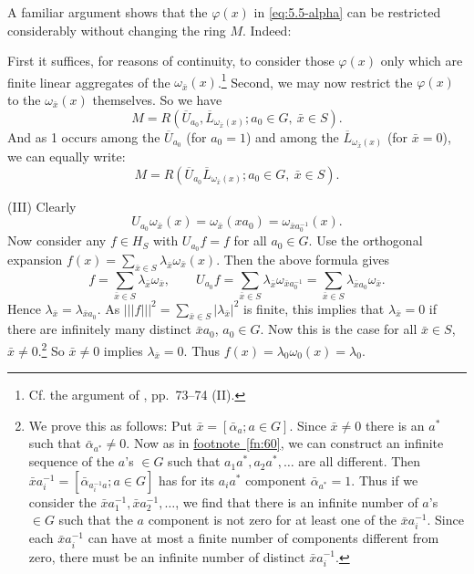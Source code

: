 \documentclass[b5paper,twoside]{article}
\theoremstyle{mvnplain}
\newcommand{\M}{\mathbf M}
\newcommand{\R}{\mathbf R}
\newcommand{\Hilbert}{\mathfrak H}
\newcommand{\OpNorm}[1]{\left\lvert\left\lvert\left\lvert#1\right\rvert\right\rvert\right\rvert}
\def\M{M}%
\def\R{R}%
\def\Hilbert{H}%
\def\mathfrak#1{#1}%
\begin{document}
A familiar argument shows that the \(\varphi(x)\) in \eqref{eq:5.5-alpha}
can be restricted considerably without changing the ring \(\M\). Indeed:

First it suffices, for reasons of continuity, to consider those \(\varphi(x)\)
only which are finite linear aggregates of the
\(\omega_{\bar x}(x)\).\footnote{Cf. the argument of
\cite{ref7}, pp.~73--74 (II).} Second, we may now restrict the
\(\varphi(x)\) to the \(\omega_{\bar x}(x)\) themselves. So we have
\begin{equation}\tag{5.5.\(\beta\)}\label{eq:5.5-beta}
 \M=\R(\overline U_{a_0},\overline L_{\omega_{\bar x}(x)};
 a_0\in\mathfrak G,\ \bar x\in\mathfrak S).
\end{equation}
And as 1 occurs among the \(\overline U_{a_0}\) (for \(a_0=1\)) and among
the \(\overline L_{\omega_{\bar x}(x)}\) (for \(\bar x=0\)), we can equally
write:
\begin{equation}\tag{5.5.\(\gamma\)}\label{eq:5.5-gamma}
 \M=\R(\overline U_{a_0}\overline L_{\omega_{\bar x}(x)};
 a_0\in\mathfrak G,\ \bar x\in\mathfrak S).
\end{equation}

(III) Clearly
\[
 U_{a_0}\omega_{\bar x}(x)=\omega_{\bar x}(xa_0)
 =\omega_{\bar x a_0^{-1}}(x).
\]
Now consider any \(f\in\Hilbert_S\) with \(U_{a_0}f=f\) for all
\(a_0\in\mathfrak G\). Use the orthogonal expansion
\(f(x)=\sum_{\bar x\in\mathfrak S}\lambda_{\bar x}\omega_{\bar x}(x)\).
Then the above formula gives
\[
 f=\sum_{\bar x\in\mathfrak S}\lambda_{\bar x}\omega_{\bar x},
 \qquad
 U_{a_0}f
 =\sum_{\bar x\in\mathfrak S}\lambda_{\bar x}
     \omega_{\bar x a_0^{-1}}
 =\sum_{\bar x\in\mathfrak S}\lambda_{\bar x a_0}\omega_{\bar x}.
\]
Hence \(\lambda_{\bar x}=\lambda_{\bar x a_0}\). As
\(\OpNorm{f}^2=\sum_{\bar x\in\mathfrak S}|\lambda_{\bar x}|^2\) is finite,
this implies that \(\lambda_{\bar x}=0\) if there are infinitely many distinct
\(\bar x a_0\), \(a_0\in\mathfrak G\). Now this is the case for all
\(\bar x\in\mathfrak S\), \(\bar x\ne0\).\footnote{\label{fn:65}We prove this as follows:
Put \(\bar x=[\bar\alpha_a;a\in\mathfrak G]\). Since \(\bar x\ne0\) there
is an \(a^*\) such that \(\bar\alpha_{a^*}\ne0\). Now as in
\hyperref[fn:60]{footnote~\ref*{fn:60}}, we
can construct an infinite sequence of the \(a\)'s \(\in\mathfrak G\) such
that \(a_1a^*,a_2a^*,\ldots\) are all different. Then
\(\bar x a_i^{-1}=[\bar\alpha_{a_i^{-1}a};a\in\mathfrak G]\) has for its
\(a_ia^*\) component \(\bar\alpha_{a^*}=1\). Thus if we consider the
\(\bar x a_1^{-1},\bar x a_2^{-1},\ldots\), we find that there is an infinite
number of \(a\)'s \(\in\mathfrak G\) such that the \(a\) component is not
zero for at least one of the \(\bar x a_i^{-1}\). Since each
\(\bar x a_i^{-1}\) can have at most a finite number of components different
from zero, there must be an infinite number of distinct \(\bar x a_i^{-1}\).}
So \(\bar x\ne0\) implies \(\lambda_{\bar x}=0\). Thus
\(f(x)=\lambda_0\omega_0(x)=\lambda_0\).
\end{document}
